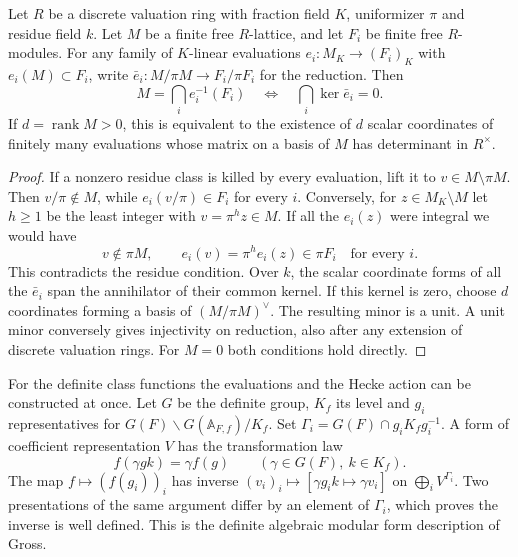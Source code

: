 \begin{auxlemma}\label{lem:marked-evaluation-criterion}
Let \(R\) be a discrete valuation ring with fraction field \(K\),
uniformizer \(\pi\) and residue field \(k\). Let \(M\) be a finite free
\(R\)-lattice, and let \(F_i\) be finite free \(R\)-modules.
For any family of \(K\)-linear evaluations
\(e_i:M_K\to (F_i)_K\) with \(e_i(M)\subset F_i\), write
\(\bar e_i:M/\pi M\to F_i/\pi F_i\) for the reduction. Then
\[
 M=\bigcap_i e_i^{-1}(F_i)
 \quad\Longleftrightarrow\quad
       \bigcap_i\ker\bar e_i=0 .
\]
If \(d=\operatorname{rank}M>0\), this is equivalent to the existence of
\(d\) scalar coordinates of finitely many evaluations whose matrix on a basis
of \(M\) has determinant in \(R^\times\).
\end{auxlemma}
\begin{proof}
If a nonzero residue class is killed by every evaluation, lift it to
\(v\in M\setminus\pi M\). Then \(v/\pi\notin M\), while
\(e_i(v/\pi)\in F_i\) for every \(i\). Conversely, for
\(z\in M_K\setminus M\) let \(h\ge1\) be the least integer with
\(v=\pi^h z\in M\). If all the \(e_i(z)\) were integral we would have
\[
 v\notin\pi M,\qquad e_i(v)=\pi^h e_i(z)\in\pi F_i
                       \quad\text{for every }i .
\]
This contradicts the residue condition. Over \(k\), the scalar coordinate
forms of all the \(\bar e_i\) span the annihilator of their common kernel.
If this kernel is zero, choose \(d\) coordinates forming a basis of
\((M/\pi M)^\vee\). The resulting minor is a unit. A unit minor
conversely gives injectivity on reduction, also after any extension of
discrete valuation rings. For \(M=0\) both conditions hold directly.
\end{proof}

For the definite class functions the evaluations and the Hecke action
can be constructed at once. Let \(G\) be the definite group, \(K_f\)
its level and \(g_i\) representatives for
\(G(F)\backslash G(\mathbb A_{F,f})/K_f\). Set
\(\Gamma_i=G(F)\cap g_iK_fg_i^{-1}\). A form of coefficient
representation \(V\) has the transformation law
\[
 f(\gamma g k)=\gamma f(g)\qquad(\gamma\in G(F),\ k\in K_f).
\]
The map \(f\mapsto(f(g_i))_i\) has inverse
\((v_i)_i\mapsto[\gamma g_i k\mapsto\gamma v_i]\) on
\(\bigoplus_i V^{\Gamma_i}\). Two presentations of the same argument
differ by an element of \(\Gamma_i\), which proves the inverse is well
defined. This is the definite algebraic modular form description of
Gross. \cite[Sections~4 and~6]{gross-algebraic-forms}


